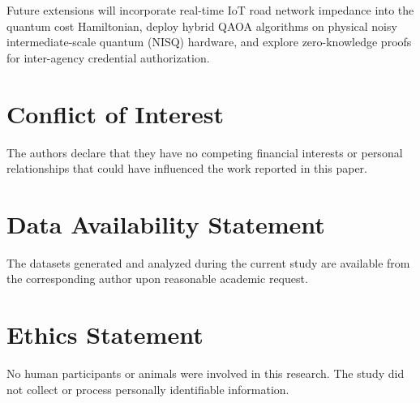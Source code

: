 \documentclass[conference]{IEEEtran}
\begin{document}
Future extensions will incorporate real-time IoT road network impedance into the quantum cost Hamiltonian, deploy hybrid QAOA algorithms on physical noisy intermediate-scale quantum (NISQ) hardware, and explore zero-knowledge proofs for inter-agency credential authorization.

\section*{Conflict of Interest}
The authors declare that they have no competing financial interests or personal relationships that could have influenced the work reported in this paper.

\section*{Data Availability Statement}
The datasets generated and analyzed during the current study are available from the corresponding author upon reasonable academic request.

\section*{Ethics Statement}
No human participants or animals were involved in this research. The study did not collect or process personally identifiable information.
\end{document}
